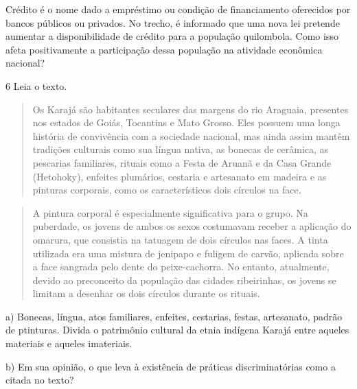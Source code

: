 Crédito é o nome dado a empréstimo ou condição de financiamento
oferecidos por bancos públicos ou privados. No trecho, é informado que
uma nova lei pretende aumentar a disponibilidade de crédito para a
população quilombola. Como isso afeta positivamente a participação dessa
população na atividade econômica nacional?


\num{6} Leia o texto.

\begin{quote}
Os Karajá são habitantes seculares das margens do rio Araguaia,
presentes nos estados de Goiás, Tocantins e Mato Grosso. Eles possuem
uma longa história de convivência com a sociedade nacional, mas ainda
assim mantêm tradições culturais como sua língua nativa, as bonecas de
cerâmica, as pescarias familiares, rituais como a Festa de Aruanã e da
Casa Grande (Hetohoky), enfeites plumários, cestaria e artesanato em
madeira e as pinturas corporais, como os característicos dois círculos
na face.
\end{quote}

\begin{quote}
A pintura corporal é especialmente significativa para o grupo. Na
puberdade, os jovens de ambos os sexos costumavam receber a aplicação do
omarura, que consistia na tatuagem de dois círculos nas faces. A tinta
utilizada era uma mistura de jenipapo e fuligem de carvão, aplicada
sobre a face sangrada pelo dente do peixe-cachorra. No entanto,
atualmente, devido ao preconceito da população das cidades ribeirinhas,
os jovens se limitam a desenhar os dois círculos durante os rituais.
\end{quote}


a) Bonecas, língua, atos familiares, enfeites, cestarias, festas,
artesanato, padrão de ptinturas. Divida o patrimônio cultural da etnia
indígena Karajá entre aqueles materiais e aqueles imateriais.


b) Em sua opinião, o que leva à existência de práticas discriminatórias
como a citada no texto?

